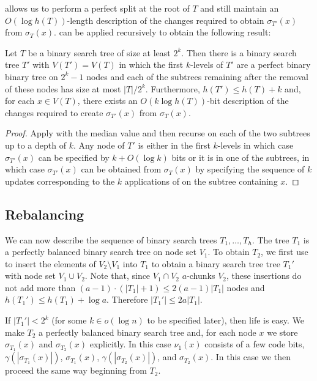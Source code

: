 \documentclass[kpfonts]{patmorin}
\begin{document}
 allows us to perform a perfect split at the root of $T$ and still maintain an $O(\log h(T))$-length description of the changes required to obtain $\sigma_{T'}(x)$ from $\sigma_T(x)$.   can be applied recursively to obtain the following result:

\begin{lem}
  Let $T$ be a binary search tree of size at least $2^k$.  Then there is a binary search tree $T'$ with $V(T')=V(T)$ in which the first $k$-levels of $T'$ are a perfect binary binary tree on $2^k-1$ nodes and each of the subtrees remaining after the removal of these nodes has size at most $|T|/2^k$.  Furthermore, $h(T')\le h(T)+k$ and, for each $x\in V(T)$, there exists an $O(k\log h(T))$-bit description of the changes required to create $\sigma_{T'}(x)$ from $\sigma_T(x)$.
\end{lem}

\begin{proof}
  Apply  with the median value and then recurse on each of the two subtrees up to a depth of $k$.  Any node of $T'$ is either in the first $k$-levels in which case $\sigma_{T'}(x)$ can be specified by $k+O(\log k)$ bits or it is in one of the subtrees, in which case $\sigma_{T'}(x)$ can be obtained from $\sigma_T(x)$ by specifying the sequence of $k$ updates corresponding to the $k$ applications of  on the subtree containing $x$.
\end{proof}

\subsection{Rebalancing}

We can now describe the sequence of binary search trees $T_1,\ldots,T_h$. The tree $T_1$ is a perfectly balanced binary search tree on node set $V_1$.  To obtain $T_2$, we first use  to insert the elements of $V_2\setminus V_1$ into $T_1$ to obtain a binary search tree tree $T_1'$ with node set $V_1\cup V_2$.   Note that, since $V_1\cap V_2$ $a$-chunks $V_2$, these insertions do not add more than $(a-1)\cdot(|T_1|+1)\le 2(a-1)|T_1|$ nodes and $h(T_1')\le h(T_1)+\log a$.  Therefore $|T_1'|\le 2a|T_1|$.

If $|T_1'|<2^k$ (for some $k\in o(\log n)$ to be specified later), then life is easy.  We make $T_2$ a perfectly balanced binary search tree and, for each node $x$ we store $\sigma_{T_1}(x)$ and $\sigma_{T_2}(x)$ explicitly.  In this case $\nu_1(x)$ consists of a few code bits, $\gamma(|\sigma_{T_1}(x)|)$, $\sigma_{T_1}(x)$, $\gamma(|\sigma_{T_2}(x)|)$, and $\sigma_{T_2}(x)$.  In this case we then proceed the same way beginning from $T_2$.
\end{document}
